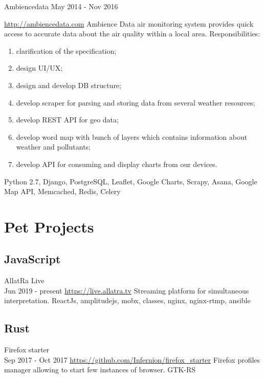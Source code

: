 \documentclass[11pt,a4paper]{moderncv}
\begin{document}
	\cvline
	{Ambiencedata May 2014 - Nov 2016}
	{\url{http://ambiencedata.com}\newline{}
		Ambience Data air monitoring system provides quick access to accurate data about the air quality within a local area.\newline{}
		Responsibilities: 
		    \begin{enumerate}
		        \item clarification of the specification;
		        \item design UI/UX;
		        \item design and develop DB structure;
		        \item develop scraper for parsing and storing data from several weather resources;
		        \item develop REST API for geo data;
		        \item develop word map with bunch of layers which contains information about weather and pollutants;
		        \item develop API for consuming and display charts from our devices.
		    \end{enumerate}
		\newline{}\newline{}
		Python 2.7, Django, PostgreSQL, Leaflet, Google Charts, Scrapy, Asana, Google Map API, Memcached, Redis, Celery}


	\section{Pet Projects}
	\subsection{JavaScript}
	\cvline
	{AllatRa Live\\ Jun 2019 - present}
	{\url{https://live.allatra.tv}\newline{}
		Streaming platform for simultaneous interpretation.\newline{}
		ReactJs, amplitudejs, mobx, classes, nginx, nginx-rtmp, ansible}
	
	\subsection{Rust}
    \cvline
	{Firefox starter\\ Sep 2017 - Oct 2017}
	{\url{https://github.com/Infernion/firefox_starter}\newline{}
		Firefox profiles manager allowing to start few instances of browser.\newline{}
		GTK-RS}
\end{document}
